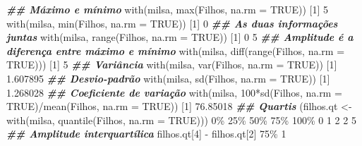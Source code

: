 \documentclass[
  10pt,
  a4paper]{book}
\newenvironment{Shaded}{\begin{snugshade}}{\end{snugshade}}
\newcommand{\AttributeTok}[1]{\textcolor[rgb]{0.77,0.63,0.00}{#1}}
\newcommand{\ConstantTok}[1]{\textcolor[rgb]{0.00,0.00,0.00}{#1}}
\newcommand{\DecValTok}[1]{\textcolor[rgb]{0.00,0.00,0.81}{#1}}
\newcommand{\DocumentationTok}[1]{\textcolor[rgb]{0.56,0.35,0.01}{\textbf{\textit{#1}}}}
\newcommand{\FloatTok}[1]{\textcolor[rgb]{0.00,0.00,0.81}{#1}}
\newcommand{\FunctionTok}[1]{\textcolor[rgb]{0.00,0.00,0.00}{#1}}
\newcommand{\NormalTok}[1]{#1}
\newcommand{\OtherTok}[1]{\textcolor[rgb]{0.56,0.35,0.01}{#1}}
\newcommand{\SpecialCharTok}[1]{\textcolor[rgb]{0.00,0.00,0.00}{#1}}
\begin{document}
\begin{Shaded}
\begin{Highlighting}[]
\DocumentationTok{\#\# Máximo e mínimo}
\FunctionTok{with}\NormalTok{(milsa, }\FunctionTok{max}\NormalTok{(Filhos, }\AttributeTok{na.rm =} \ConstantTok{TRUE}\NormalTok{))}
\NormalTok{[}\DecValTok{1}\NormalTok{] }\DecValTok{5}
\FunctionTok{with}\NormalTok{(milsa, }\FunctionTok{min}\NormalTok{(Filhos, }\AttributeTok{na.rm =} \ConstantTok{TRUE}\NormalTok{))}
\NormalTok{[}\DecValTok{1}\NormalTok{] }\DecValTok{0}
\DocumentationTok{\#\# As duas informações juntas}
\FunctionTok{with}\NormalTok{(milsa, }\FunctionTok{range}\NormalTok{(Filhos, }\AttributeTok{na.rm =} \ConstantTok{TRUE}\NormalTok{))}
\NormalTok{[}\DecValTok{1}\NormalTok{] }\DecValTok{0} \DecValTok{5}
\DocumentationTok{\#\# Amplitude é a diferença entre máximo e mínimo}
\FunctionTok{with}\NormalTok{(milsa, }\FunctionTok{diff}\NormalTok{(}\FunctionTok{range}\NormalTok{(Filhos, }\AttributeTok{na.rm =} \ConstantTok{TRUE}\NormalTok{)))}
\NormalTok{[}\DecValTok{1}\NormalTok{] }\DecValTok{5}
\DocumentationTok{\#\# Variância}
\FunctionTok{with}\NormalTok{(milsa, }\FunctionTok{var}\NormalTok{(Filhos, }\AttributeTok{na.rm =} \ConstantTok{TRUE}\NormalTok{))}
\NormalTok{[}\DecValTok{1}\NormalTok{] }\FloatTok{1.607895}
\DocumentationTok{\#\# Desvio{-}padrão}
\FunctionTok{with}\NormalTok{(milsa, }\FunctionTok{sd}\NormalTok{(Filhos, }\AttributeTok{na.rm =} \ConstantTok{TRUE}\NormalTok{))}
\NormalTok{[}\DecValTok{1}\NormalTok{] }\FloatTok{1.268028}
\DocumentationTok{\#\# Coeficiente de variação}
\FunctionTok{with}\NormalTok{(milsa, }\DecValTok{100}\SpecialCharTok{*}\FunctionTok{sd}\NormalTok{(Filhos, }\AttributeTok{na.rm =} \ConstantTok{TRUE}\NormalTok{)}\SpecialCharTok{/}\FunctionTok{mean}\NormalTok{(Filhos, }\AttributeTok{na.rm =} \ConstantTok{TRUE}\NormalTok{))}
\NormalTok{[}\DecValTok{1}\NormalTok{] }\FloatTok{76.85018}
\DocumentationTok{\#\# Quartis}
\NormalTok{(filhos.qt }\OtherTok{\textless{}{-}} \FunctionTok{with}\NormalTok{(milsa, }\FunctionTok{quantile}\NormalTok{(Filhos, }\AttributeTok{na.rm =} \ConstantTok{TRUE}\NormalTok{)))}
  \DecValTok{0}\SpecialCharTok{\%  25\%}  \DecValTok{50}\SpecialCharTok{\%  75\%} \DecValTok{100}\NormalTok{\% }
   \DecValTok{0}    \DecValTok{1}    \DecValTok{2}    \DecValTok{2}    \DecValTok{5} 
\DocumentationTok{\#\# Amplitude interquartílica}
\NormalTok{filhos.qt[}\DecValTok{4}\NormalTok{] }\SpecialCharTok{{-}}\NormalTok{ filhos.qt[}\DecValTok{2}\NormalTok{]}
\DecValTok{75}\NormalTok{\% }
  \DecValTok{1} 
\end{Highlighting}
\end{Shaded}
\end{document}
